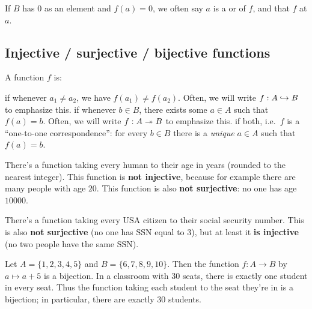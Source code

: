 If $B$ has $0$ as an element and $f(a) = 0$,
we often say $a$ is a  or  of $f$,
and that $f$  at $a$.

\subsection{Injective / surjective / bijective functions}
\begin{definition}
	A function $f$ is:
	\begin{itemize}
		\ii {} if whenever $a_1 \neq a_2$, we have $f(a_1) \neq f(a_2)$.
		Often, we will write $f : A \hookrightarrow B$ to emphasize this.
		\ii {} if whenever $b \in B$, there exists some $a \in A$
		such that $f(a) = b$.
		Often, we will write $f : A \twoheadrightarrow B$ to emphasize this.
		\ii {} if both, i.e.\ $f$ is a ``one-to-one correspondence'':
		for every $b \in B$ there is a \emph{unique} $a \in A$
		such that $f(a) = b$.
	\end{itemize}
\end{definition}

\begin{example}
	\listhack
	\begin{enumerate}[(a)]
		\ii There's a function taking every human to their
		age in years (rounded to the nearest integer).
		This function is \textbf{not injective},
		because for example there are many people with age $20$.
		This function is also \textbf{not surjective}: no one has age $10000$.

		\ii There's a function taking every
		USA citizen to their social security number.
		This is also \textbf{not surjective} (no one has SSN equal to $3$),
		but at least it \textbf{is injective} (no two people have the same SSN).
	\end{enumerate}
\end{example}

\begin{example}
	\listhack
	\begin{enumerate}[(a)]
		\ii Let $A = \{1,2,3,4,5\}$ and $B = \{6,7,8,9,10\}$.
		Then the function $f : A \to B$ by $a \mapsto a+5$ is a bijection.
		\ii In a classroom with $30$ seats,
		there is exactly one student in every seat.
		Thus the function taking each student to the seat they're in
		is a bijection; in particular, there are exactly $30$ students.
	\end{enumerate}
\end{example}

